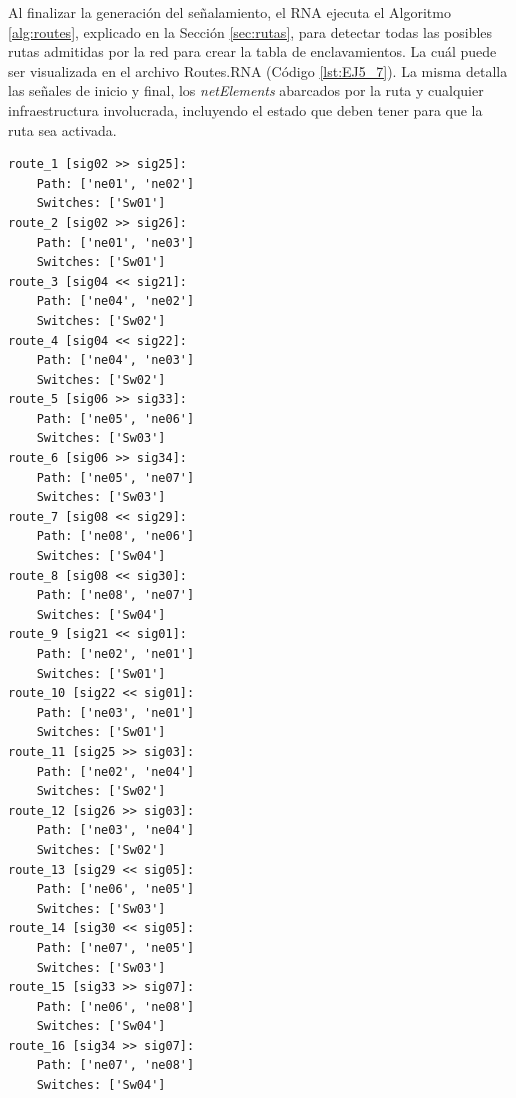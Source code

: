 	Al finalizar la generación del señalamiento, el RNA ejecuta el Algoritmo \ref{alg:routes}, explicado en la Sección \ref{sec:rutas}, para detectar todas las posibles rutas admitidas por la red para crear la tabla de enclavamientos. La cuál puede ser visualizada en el archivo Routes.RNA (Código \ref{lst:EJ5_7}). La misma detalla las señales de inicio y final, los \textit{netElements} abarcados por la ruta y cualquier infraestructura involucrada, incluyendo el estado que deben tener para que la ruta sea activada.
	
	\begin{lstlisting}[language = {}, caption = Routes.RNA, label = {lst:EJ5_7}]
route_1 [sig02 >> sig25]:
	Path: ['ne01', 'ne02']
	Switches: ['Sw01']
route_2 [sig02 >> sig26]:
	Path: ['ne01', 'ne03']
	Switches: ['Sw01']
route_3 [sig04 << sig21]:
	Path: ['ne04', 'ne02']
	Switches: ['Sw02']
route_4 [sig04 << sig22]:
	Path: ['ne04', 'ne03']
	Switches: ['Sw02']
route_5 [sig06 >> sig33]:
	Path: ['ne05', 'ne06']
	Switches: ['Sw03']
route_6 [sig06 >> sig34]:
	Path: ['ne05', 'ne07']
	Switches: ['Sw03']
route_7 [sig08 << sig29]:
	Path: ['ne08', 'ne06']
	Switches: ['Sw04']
route_8 [sig08 << sig30]:
	Path: ['ne08', 'ne07']
	Switches: ['Sw04']
route_9 [sig21 << sig01]:
	Path: ['ne02', 'ne01']
	Switches: ['Sw01']
route_10 [sig22 << sig01]:
	Path: ['ne03', 'ne01']
	Switches: ['Sw01']
route_11 [sig25 >> sig03]:
	Path: ['ne02', 'ne04']
	Switches: ['Sw02']
route_12 [sig26 >> sig03]:
	Path: ['ne03', 'ne04']
	Switches: ['Sw02']
route_13 [sig29 << sig05]:
	Path: ['ne06', 'ne05']
	Switches: ['Sw03']
route_14 [sig30 << sig05]:
	Path: ['ne07', 'ne05']
	Switches: ['Sw03']
route_15 [sig33 >> sig07]:
	Path: ['ne06', 'ne08']
	Switches: ['Sw04']
route_16 [sig34 >> sig07]:
	Path: ['ne07', 'ne08']
	Switches: ['Sw04']
	\end{lstlisting}
	
	
	
	